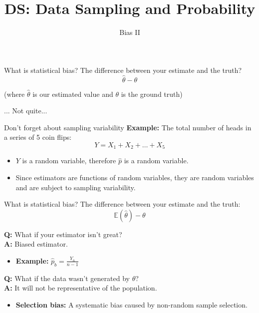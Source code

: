 \documentclass[aspectratio=169]{../latex_main/tntbeamer}  %
\title[Bias II]{DS: Data Sampling and Probability}
\subtitle{Bias II}
\begin{document}
	
	\maketitle
	
\begin{frame}{What is statistical bias?}
    The difference between your estimate and the truth?\\

$$\hat{\theta} - \theta$$

(where $\hat{\theta}$ is our estimated value and $\theta$ is the ground truth)

    \bigskip
    ... Not quite...
\end{frame}

\begin{frame}{Don’t forget about sampling variability}
    \textbf{Example:} The total number of heads in a series of 5 coin flips: 
    \begin{equation}
    Y = X_1 + X_2 + \dots + X_5
    \end{equation}
    \begin{itemize}
        \item $Y$ is a random variable, therefore $\hat{p}$ is a random variable.
        \item Since estimators are functions of random variables, they are random variables and are subject to sampling variability.
    \end{itemize}
\end{frame}

\begin{frame}{What is statistical bias?}
    The difference between your estimate and the truth:\\

    $$\mathbb{E}(\hat{\theta}) - \theta$$

    \textbf{Q:} What if your estimator isn’t great?\\
    \textbf{A:} Biased estimator.
    \begin{itemize}
        \item \textbf{Example:} $\hat{p}_b = \frac{Y_n}{n - 1}$
    \end{itemize}

    \bigskip

    \textbf{Q:} What if the data wasn’t generated by $\theta$?\\
    \textbf{A:} It will not be representative of the population. 
    \begin{itemize}
        \item \textbf{Selection bias:} A systematic bias caused by non-random sample selection.
    \end{itemize}
\end{frame}
	
\end{document}
